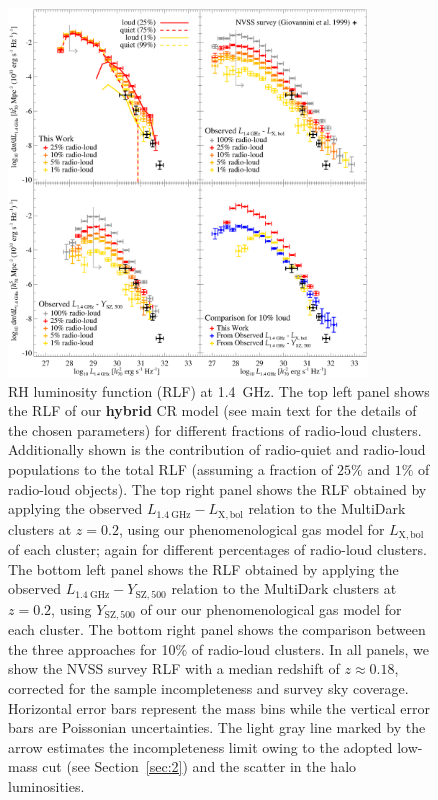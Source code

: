 \documentclass[traditabstract]{aa}
\def\C#1{{\bf #1}}
\newcommand{\rmn}{\mathrm}
\begin{document}
\begin{figure}[t]
\centering
\includegraphics[width=0.85\textwidth]{figures/RLFs_1.4.eps}
\caption{RH luminosity function (RLF) at 1.4~GHz. The top left panel shows
  the RLF of our \C{hybrid} CR model (see main text for the details of the chosen
  parameters) for different fractions of radio-loud clusters. Additionally shown
  is the contribution of radio-quiet and radio-loud populations to the total RLF
  (assuming a fraction of $25\%$ and $1\%$ of radio-loud objects). The top right
  panel shows the RLF obtained by applying the observed
  $L_{1.4~\rmn{GHz}}-L_{\rmn{X,bol}}$ relation to the MultiDark clusters at $z =
  0.2$, using our phenomenological gas model for $L_{\rmn{X,bol}}$ of each
  cluster; again for different percentages of radio-loud clusters.  The bottom
  left panel shows the RLF obtained by applying the observed
  $L_{1.4~\rmn{GHz}}-Y_{\rmn{SZ}, 500}$ relation to the MultiDark clusters at $z
  = 0.2$, using $Y_{\rmn{SZ}, 500}$ of our our phenomenological gas model
  for each cluster. The bottom right panel shows the comparison between the
  three approaches for 10\% of radio-loud clusters. In all panels, we show the
  NVSS survey RLF \citep{1999NewA....4..141G} with a median redshift of 
  $z\approx 0.18$, corrected for the sample incompleteness and survey sky coverage. 
  Horizontal error bars represent the mass bins while the vertical error bars are Poissonian 
  uncertainties. The light gray line marked by the arrow estimates the incompleteness limit owing
  to the adopted low-mass cut (see Section~\ref{sec:2}) and the scatter in the
  halo luminosities.}
\label{fig:RLF_1.4}
\end{figure}
\end{document}
